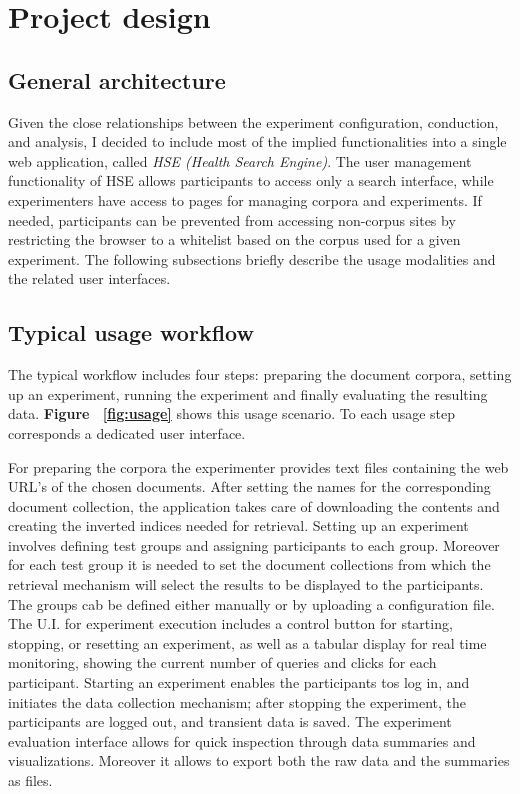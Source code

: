 \documentclass[]{usiinfbachelorproject}
\begin{document}
\section{Project design} \label{design}

\subsection{General architecture}

Given the close relationships between the experiment configuration, conduction, and analysis, I decided to include
most of the implied functionalities into a single web application, called \emph{HSE (Health Search Engine)}.
The user management functionality of HSE allows participants to access only a search interface, while experimenters
have access to pages for managing corpora and experiments. If needed, participants can be prevented from
accessing non-corpus sites by restricting the browser to a whitelist based on the corpus used for a given experiment.
The following subsections briefly describe the usage modalities and the related user interfaces.

\subsection{Typical usage workflow}

The typical workflow includes four steps: preparing the document corpora, setting up an experiment, running the experiment
and finally evaluating the resulting data. \textbf{Figure ~\ref{fig:usage}} shows this usage scenario. 
To each usage step corresponds a dedicated user interface. 

For preparing the corpora the experimenter provides text files containing the web URL's of the chosen documents. After setting the names for the
corresponding document collection, the application takes care of downloading the contents and creating the inverted indices needed for retrieval.
Setting up an experiment involves defining test groups and assigning participants to each group. Moreover for each test group it is needed
to set the document collections from which the retrieval mechanism will select the results to be displayed to the participants.
The groups cab be defined either manually or by uploading a configuration file.
The U.I. for experiment execution includes a control button for starting, stopping, or resetting an experiment, as well 
as a tabular display for real time monitoring, showing the current number of queries and clicks for each participant.
Starting an experiment enables the participants tos log in, and initiates the data collection mechanism; after
stopping the experiment, the participants are logged out, and transient data is saved.
The experiment evaluation interface  allows for quick inspection through data summaries and visualizations. Moreover it allows
to export both the raw data and the summaries as files.
\end{document}
